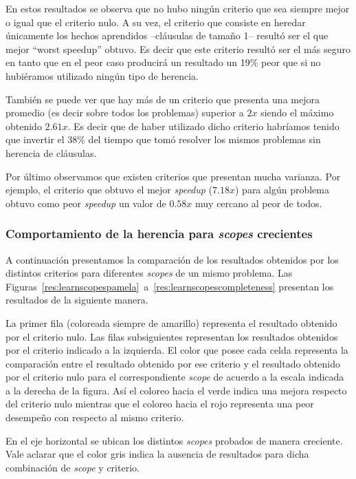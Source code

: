 En estos resultados se observa que no hubo ningún criterio que sea siempre
mejor o igual que el criterio nulo. A su vez, el criterio que consiste en
heredar únicamente los hechos aprendidos --cláusulas de tamaño 1-- resultó ser
el que mejor ``worst speedup'' obtuvo. Es decir que este criterio resultó ser
el más seguro en tanto que en el peor caso producirá un resultado un 19\% peor
que si no hubiéramos utilizado ningún tipo de herencia.

También se puede ver que hay más de un criterio que presenta una mejora
promedio (es decir sobre todos los problemas) superior a $2x$ siendo el máximo
obtenido $2.61x$. Es decir que de haber utilizado dicho criterio habríamos
tenido que invertir el 38\% del tiempo que tomó resolver los mismos problemas
sin herencia de cláusulas.

Por último observamos que existen criterios que presentan mucha varianza. Por
ejemplo, el criterio que obtuvo el mejor \emph{speedup} ($7.18x$) para algún
problema obtuvo como peor \emph{speedup} un valor de $0.58x$ muy cercano al
peor de todos.

\subsubsection{Comportamiento de la herencia para \emph{scopes} crecientes}

A continuación presentamos la comparación de los resultados obtenidos por los
distintos criterios para diferentes \emph{scopes} de un mismo problema. Las
Figuras~\ref{res:learnscopespamela}~a~\ref{res:learnscopescompleteness}
presentan los resultados de la siguiente manera. 

La primer fila (coloreada siempre de amarillo) representa el resultado
obtenido por el criterio nulo. Las filas subsiguientes representan los
resultados obtenidos por el criterio indicado a la izquierda. El color que
posee cada celda representa la comparación entre el resultado obtenido por ese
criterio y el resultado obtenido por el criterio nulo para el correspondiente
\emph{scope} de acuerdo a la escala indicada a la derecha de la figura. Así el
coloreo hacia el verde indica una mejora respecto del criterio nulo mientras
que el coloreo hacia el rojo representa una peor desempeño con respecto al
mismo criterio.

En el eje horizontal se ubican los distintos \emph{scopes} probados de manera
creciente. Vale aclarar que el color gris indica la ausencia de resultados
para dicha combinación de \emph{scope} y criterio.

